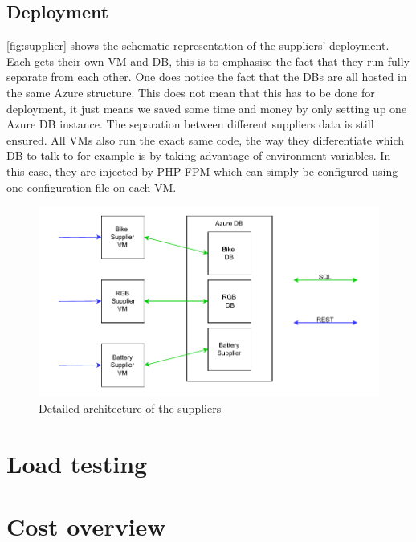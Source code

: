 \documentclass[10pt,a4paper,kul]{kulakarticle} %
\begin{document}
		\subsection{Deployment}
			\autoref{fig:supplier} shows the schematic representation of the suppliers' deployment. Each gets their own VM and DB, this is to emphasise the fact that they run fully separate from each other. One does notice the fact that the DBs are all hosted in the same Azure structure. This does not mean that this has to be done for deployment, it just means we saved some time and money by only setting up one Azure DB instance. The separation between different suppliers data is still ensured. All VMs also run the exact same code, the way they differentiate which DB to talk to for example is by taking advantage of environment variables. In this case, they are injected by PHP-FPM which can simply be configured using one configuration file on each VM. 
			\begin{figure}[h!]
				\centering
				\includegraphics[width=0.7\linewidth]{images/supplier}
				\caption{Detailed architecture of the suppliers}
				\label{fig:supplier}
			\end{figure}
		
	\section{Load testing}


	\section{Cost overview}
\end{document}
